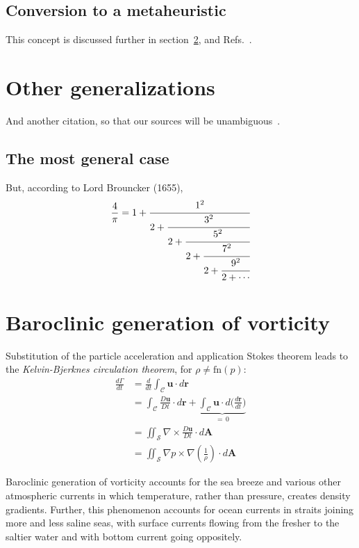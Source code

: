 \subsection{Conversion to a metaheuristic}

\lipsum[11-12] This concept is discussed further in section~\ref{sec:stratified-flow}, and Refs.~\cite{euler1740,fourier1822}.


\section{Other generalizations}

\lipsum[7] And another citation, so that our sources will be unambiguous~\cite{montijano2014}.

\subsection{The most general case}
\lipsum[13]  But, according to Lord Brouncker (1655),
\begin{equation}
\frac{4}{\pi} = 1+ \cfrac{1^2}{2+
                     \cfrac{3^2}{2+
                       \cfrac{5^2}{2+
                         \cfrac{7^2}{2+
                           \cfrac{9^2}{2+\dotsb
}}}}}
\end{equation}

\section{Baroclinic generation of vorticity}\label{sec:stratified-flow}

Substitution of the particle acceleration and application Stokes theorem leads to the \textit{Kelvin-Bjerknes circulation theorem}, for
$\rho \neq \textrm{fn}(p)$:
\begin{align}
\frac{d\Gamma}{dt} &{}= \frac{d}{dt} \int_{\mathcal{C}} \mathbf{u} \cdot d\mathbf{r}\\
				   &{}= \int_{\mathcal{C}} \frac{D\mathbf{u}}{Dt} \cdot d\mathbf{r} + \underbrace{\int_{\mathcal{C}} \mathbf{u}\cdot d\biggl( \frac{d\mathbf{r}}{dt}\biggr)}_{=\, 0} \\[-2pt]
                   &{}= \iint_{\mathcal{S}} \nabla \times \frac{D\mathbf{u}}{Dt}  \cdot d\mathbf{A}\\
                   &{}= \iint_{\mathcal{S}}  \nabla p \times \nabla \left( \frac{1}{\rho}\right) \cdot d\mathbf{A}
\end{align}

Baroclinic generation of vorticity accounts for the sea breeze and various other atmospheric currents in which temperature, rather than pressure, creates density gradients. Further, this phenomenon accounts for ocean currents in straits joining more and less saline seas, with surface currents flowing from the fresher to the saltier water and with bottom current going oppositely.

